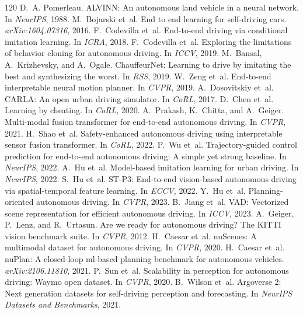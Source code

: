 \documentclass[10pt,twocolumn]{article}
\begin{document}
\begin{thebibliography}{120}
 D.~A. Pomerleau. ALVINN: An autonomous land vehicle in a neural network. In \emph{NeurIPS}, 1988.
 M.~Bojarski et~al. End to end learning for self-driving cars. \emph{arXiv:1604.07316}, 2016.
 F.~Codevilla et~al. End-to-end driving via conditional imitation learning. In \emph{ICRA}, 2018.
 F.~Codevilla et~al. Exploring the limitations of behavior cloning for autonomous driving. In \emph{ICCV}, 2019.
 M.~Bansal, A.~Krizhevsky, and A.~Ogale. ChauffeurNet: Learning to drive by imitating the best and synthesizing the worst. In \emph{RSS}, 2019.
 W.~Zeng et~al. End-to-end interpretable neural motion planner. In \emph{CVPR}, 2019.
 A.~Dosovitskiy et~al. CARLA: An open urban driving simulator. In \emph{CoRL}, 2017.
 D.~Chen et~al. Learning by cheating. In \emph{CoRL}, 2020.
 A.~Prakash, K.~Chitta, and A.~Geiger. Multi-modal fusion transformer for end-to-end autonomous driving. In \emph{CVPR}, 2021.
 H.~Shao et~al. Safety-enhanced autonomous driving using interpretable sensor fusion transformer. In \emph{CoRL}, 2022.
 P.~Wu et~al. Trajectory-guided control prediction for end-to-end autonomous driving: A simple yet strong baseline. In \emph{NeurIPS}, 2022.
 A.~Hu et~al. Model-based imitation learning for urban driving. In \emph{NeurIPS}, 2022.
 S.~Hu et~al. ST-P3: End-to-end vision-based autonomous driving via spatial-temporal feature learning. In \emph{ECCV}, 2022.
 Y.~Hu et~al. Planning-oriented autonomous driving. In \emph{CVPR}, 2023.
 B.~Jiang et~al. VAD: Vectorized scene representation for efficient autonomous driving. In \emph{ICCV}, 2023.
 A.~Geiger, P.~Lenz, and R.~Urtasun. Are we ready for autonomous driving? The KITTI vision benchmark suite. In \emph{CVPR}, 2012.
 H.~Caesar et~al. nuScenes: A multimodal dataset for autonomous driving. In \emph{CVPR}, 2020.
 H.~Caesar et~al. nuPlan: A closed-loop ml-based planning benchmark for autonomous vehicles. \emph{arXiv:2106.11810}, 2021.
 P.~Sun et~al. Scalability in perception for autonomous driving: Waymo open dataset. In \emph{CVPR}, 2020.
 B.~Wilson et~al. Argoverse 2: Next generation datasets for self-driving perception and forecasting. In \emph{NeurIPS Datasets and Benchmarks}, 2021.

\end{thebibliography}
\end{document}

